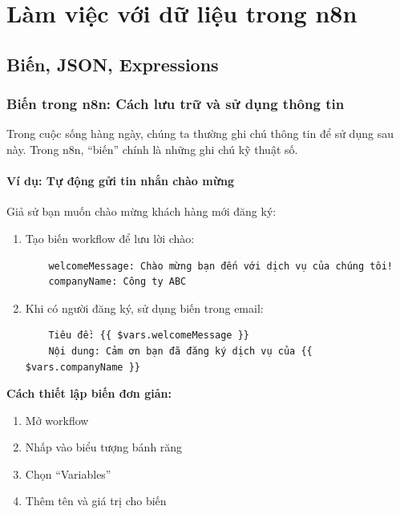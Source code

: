 \chapter{Làm việc với dữ liệu trong n8n}

\section{Biến, JSON, Expressions}

\subsection{Biến trong n8n: Cách lưu trữ và sử dụng thông tin}

Trong cuộc sống hàng ngày, chúng ta thường ghi chú thông tin để sử dụng sau này. Trong n8n, ``biến'' chính là những ghi chú kỹ thuật số.

\subsubsection{Ví dụ: Tự động gửi tin nhắn chào mừng}

Giả sử bạn muốn chào mừng khách hàng mới đăng ký:

\begin{enumerate}
    \item Tạo biến workflow để lưu lời chào:
    \begin{verbatim}
    welcomeMessage: Chào mừng bạn đến với dịch vụ của chúng tôi!
    companyName: Công ty ABC
    \end{verbatim}

    \item Khi có người đăng ký, sử dụng biến trong email:
    \begin{verbatim}
    Tiêu đề: {{ $vars.welcomeMessage }}
    Nội dung: Cảm ơn bạn đã đăng ký dịch vụ của {{ $vars.companyName }}
    \end{verbatim}
\end{enumerate}


\textbf{Cách thiết lập biến đơn giản:}
\begin{enumerate}
    \item Mở workflow
    \item Nhấp vào biểu tượng bánh răng
    \item Chọn ``Variables''
    \item Thêm tên và giá trị cho biến
\end{enumerate}

